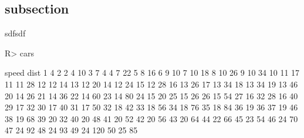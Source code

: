 \documentclass[nojss]{jss}
\begin{document}
\subsection{subsection}\label{subsection}

sdfsdf

\begin{CodeChunk}

\begin{CodeInput}
R> cars
\end{CodeInput}

\begin{CodeOutput}
   speed dist
1      4    2
2      4   10
3      7    4
4      7   22
5      8   16
6      9   10
7     10   18
8     10   26
9     10   34
10    11   17
11    11   28
12    12   14
13    12   20
14    12   24
15    12   28
16    13   26
17    13   34
18    13   34
19    13   46
20    14   26
21    14   36
22    14   60
23    14   80
24    15   20
25    15   26
26    15   54
27    16   32
28    16   40
29    17   32
30    17   40
31    17   50
32    18   42
33    18   56
34    18   76
35    18   84
36    19   36
37    19   46
38    19   68
39    20   32
40    20   48
41    20   52
42    20   56
43    20   64
44    22   66
45    23   54
46    24   70
47    24   92
48    24   93
49    24  120
50    25   85
\end{CodeOutput}
\end{CodeChunk}
\end{document}
